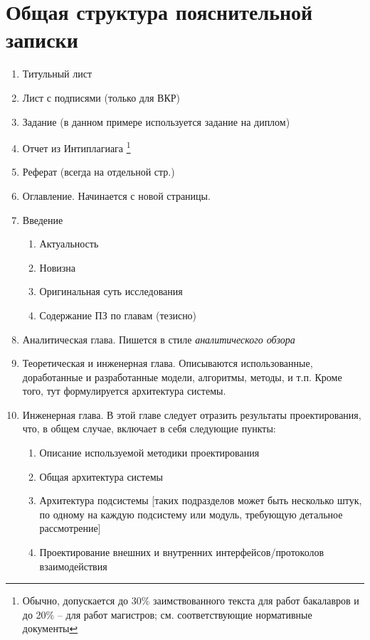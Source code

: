 \chapter{Общая структура пояснительной записки}\label{app-structure}

\begin{enumerate}
	\item Титульный лист %
	\item Лист с подписями (только для ВКР)
	\item Задание (в данном примере используется задание на диплом)
	\item Отчет из Интиплагиага \footnote{Обычно, допускается до 30\% заимствованного текста для работ бакалавров и до 20\% -- для работ магистров; см. соответствующие нормативные документы}
	\item Реферат (всегда на отдельной стр.)%
	\item Оглавление. Начинается с новой страницы. %
	\item Введение
	\begin{enumerate}
		\item Актуальность
		\item Новизна
		\item Оригинальная суть исследования
		\item Содержание ПЗ по главам (тезисно)
	\end{enumerate}
	\item Аналитическая глава. Пишется в стиле \textit{аналитического обзора}
	\item Теоретическая и инженерная глава. Описываются использованные, доработанные и разработанные модели, алгоритмы, методы, и т.п. Кроме того, тут формулируется архитектура системы.
	\item Инженерная глава. В этой главе следует отразить результаты проектирования, что, в общем случае, включает в себя следующие пункты:
	\begin{enumerate}
		\item Описание используемой методики проектирования
		\item Общая архитектура системы
		\item Архитектура подсистемы [таких подразделов может быть несколько штук, по одному на каждую подсистему или модуль, требующую детальное рассмотрение]
		\item Проектирование внешних и внутренних интерфейсов/протоколов взаимодействия

\end{enumerate}
\end{enumerate}
